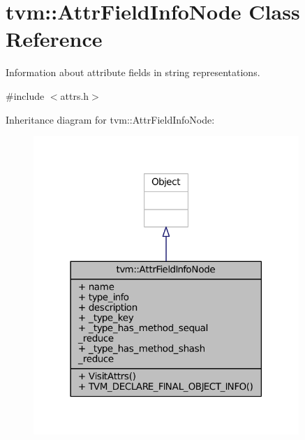 \hypertarget{classtvm_1_1AttrFieldInfoNode}{}\section{tvm\+:\+:Attr\+Field\+Info\+Node Class Reference}
\label{classtvm_1_1AttrFieldInfoNode}


Information about attribute fields in string representations.  




{\ttfamily \#include $<$attrs.\+h$>$}



Inheritance diagram for tvm\+:\+:Attr\+Field\+Info\+Node\+:
\nopagebreak
\begin{figure}[H]
\begin{center}
\leavevmode
\includegraphics[width=285pt]{classtvm_1_1AttrFieldInfoNode__inherit__graph}
\end{center}
\end{figure}


